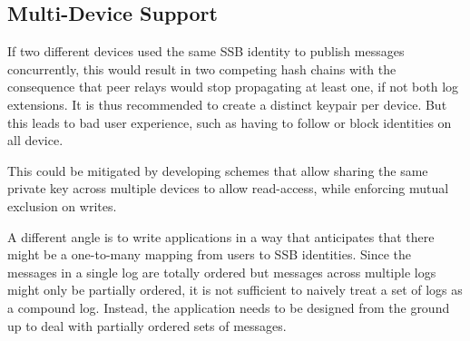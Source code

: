\documentclass[9pt,sigconf]{acmart}
\begin{document}



\subsection{Multi-Device Support}

If two different devices used the same SSB identity to publish messages concurrently, this would result in two competing hash chains with the consequence that peer relays would stop propagating at least one, if not both log extensions. It is thus recommended to create a distinct keypair per device. But this leads to bad user experience, such as having to follow or block identities on all device.

This could be mitigated by developing schemes that allow sharing the same private key across multiple devices to allow read-access, while enforcing mutual exclusion on writes.

A different angle is to write applications in a way that anticipates that there might be a one-to-many mapping from users to SSB identities. Since the messages in a single log are totally ordered but messages across multiple logs might only be partially ordered, it is not sufficient to naively treat a set of logs as a compound log. Instead, the application needs to be designed from the ground up to deal with partially ordered sets of messages.

\end{document}
